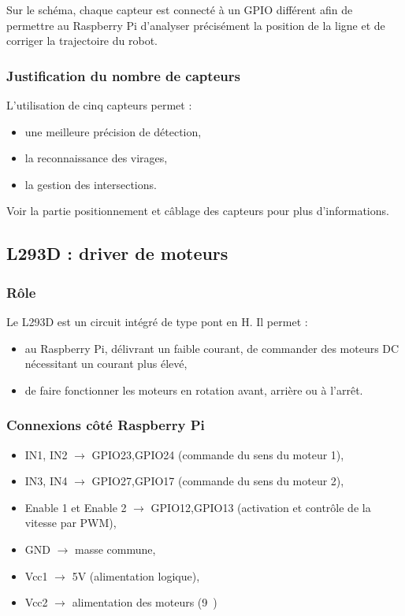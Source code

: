 Sur le schéma, chaque capteur est connecté à un GPIO différent afin de permettre au Raspberry Pi d’analyser précisément la position de la ligne et de corriger la trajectoire du robot.

\subsubsection{Justification du nombre de capteurs}
L’utilisation de cinq capteurs permet :
\begin{itemize}
    \item une meilleure précision de détection,
    \item la reconnaissance des virages,
    \item la gestion des intersections.
\end{itemize}
Voir la partie positionnement et câblage des capteurs pour plus d'informations.


\subsection{L293D : driver de moteurs}

\subsubsection{Rôle}
Le L293D est un circuit intégré de type pont en H. Il permet :
\begin{itemize}
    \item au Raspberry Pi, délivrant un faible courant, de commander des moteurs DC nécessitant un courant plus élevé,
    \item de faire fonctionner les moteurs en rotation avant, arrière ou à l’arrêt.
\end{itemize}

\subsubsection{Connexions côté Raspberry Pi}
\begin{itemize}
    \item IN1, IN2 $\rightarrow$ GPIO23,GPIO24 (commande du sens du moteur 1),
    \item IN3, IN4 $\rightarrow$ GPIO27,GPIO17 (commande du sens du moteur 2),
    \item Enable 1 et Enable 2 $\rightarrow$ GPIO12,GPIO13 (activation et contrôle de la vitesse par PWM),
    \item GND $\rightarrow$ masse commune,
    \item Vcc1 $\rightarrow$ 5V (alimentation logique),
    \item Vcc2 $\rightarrow$ alimentation des moteurs (9~)

\end{itemize}

